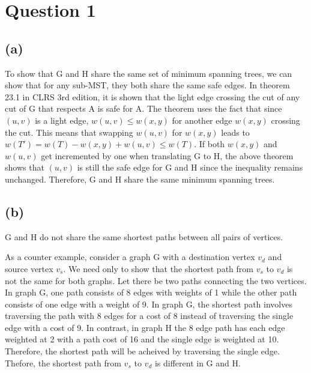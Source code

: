 \section{Question 1}
	\subsection{(a)}
	To show that G and H share the same set of minimum spanning trees, we can show that for any sub-MST, they both share the same safe edges.
	In theorem 23.1 in CLRS 3rd edition, it is shown that the light edge crossing the cut of any cut of G that respects A is safe for A.
	The theorem uses the fact that since $(u,v)$ is a light edge, $w(u,v) \leq w(x,y)$ for another edge $w(x,y)$ crossing the cut. 
	This means that swapping $w(u,v)$ for $w(x,y)$ leads to $w(T') = w(T) - w(x,y) + w(u,v) \leq w(T)$.
	If both $w(x,y)$ and $w(u,v)$ get incremented by one when translating G to H, the above theorem shows that $(u, v)$ is still the safe edge for G and H
	since the inequality remains unchanged. Therefore, G and H share the same minimum spanning trees.

	\subsection{(b)}
		G and H do not share the same shortest paths between all pairs of vertices.\vspace{3mm}
		
		As a counter example, consider a graph G with a destination vertex $v_d$ and source vertex $v_s$.
		We need only to show that the shortest path from $v_s$ to $v_d$ is not the same for both graphs.
		Let there be two paths connecting the two vertices. In graph G, one path consists of 8 edges with weights of 1
		while the other path consists of one edge with a weight of 9. In graph G, the shortest path involves traversing
		the path with 8 edges for a cost of 8 instead of traversing the single edge with a cost of 9. In contrast, in graph H
		the 8 edge path has each edge weighted at 2 with a path cost of 16 and the single edge is weighted at 10. Therefore,
		the shortest path will be acheived by traversing the single edge. Thefore, the shortest path from $v_s$ to $v_d$ is
		different in G and H.